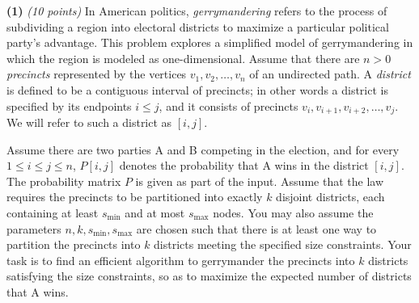\documentclass[12pt]{article}
\def\bigap{0.25in}
\begin{document}
\setlength{\parindent}{0in}
\addtolength{\parskip}{0.1cm}
\setlength{\fboxrule}{.5mm}\setlength{\fboxsep}{1.2mm}
\newlength{\boxlength}\setlength{\boxlength}{\textwidth}
\addtolength{\boxlength}{-4mm}
\begin{center}
\end{center}
\vspace{5mm}
\vskip \bigap
{\bf (1)} {\em (10 points)}
In American politics, {\em gerrymandering} refers to the process of
subdividing a region into electoral districts to maximize a particular
political party's advantage. This problem explores a simplified model
of gerrymandering in which the region is modeled as one-dimensional.
Assume that there are $n > 0$ {\em precincts} represented by the
vertices $v_1,v_2,\ldots,v_n$ of an undirected path.
A {\em district} is defined to be a contiguous interval of precincts;
in other words a district is specified by its endpoints $i \le j$,
and it consists of precincts $v_i,v_{i+1},v_{i+2},\ldots,v_j$.
We will refer to such a district as $[i,j]$.

Assume there are two parties A and B competing in the election,
and for every  $ 1 \le i \le  j \le n$, $P[i,j]$ denotes the
probability that A wins in the district $[i,j]$.
The probability matrix $P$ is given as part of the input.
Assume that the law requires the precincts to be partitioned
into exactly $k$ disjoint districts, each containing at least
$s_{\min}$ and at most $s_{\max}$ nodes. You may also assume
the parameters $n,k,s_{\min},s_{\max}$ are chosen such that
there is at least one way to partition the precincts into
$k$ districts meeting the specified size constraints.
Your task is to find an efficient algorithm to gerrymander the
precincts into $k$ districts satisfying the size constraints,
so as to maximize the expected number of districts that A wins.

\vskip \bigap


\end{document}
